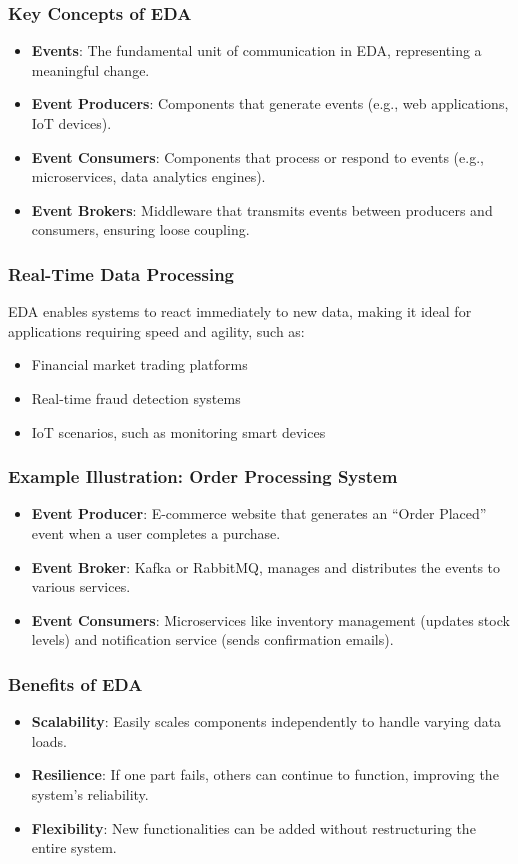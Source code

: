 \documentclass[aspectratio=169]{beamer}
\begin{document}
\begin{frame}[fragile]
    \frametitle{Key Concepts of EDA}
    \begin{itemize}
        \item \textbf{Events}: The fundamental unit of communication in EDA, representing a meaningful change.
        \item \textbf{Event Producers}: Components that generate events (e.g., web applications, IoT devices).
        \item \textbf{Event Consumers}: Components that process or respond to events (e.g., microservices, data analytics engines).
        \item \textbf{Event Brokers}: Middleware that transmits events between producers and consumers, ensuring loose coupling.
    \end{itemize}
\end{frame}

\begin{frame}[fragile]
    \frametitle{Real-Time Data Processing}
    EDA enables systems to react immediately to new data, making it ideal for applications requiring speed and agility, such as:
    \begin{itemize}
        \item Financial market trading platforms
        \item Real-time fraud detection systems
        \item IoT scenarios, such as monitoring smart devices
    \end{itemize}
\end{frame}

\begin{frame}[fragile]
    \frametitle{Example Illustration: Order Processing System}
    \begin{itemize}
        \item \textbf{Event Producer}: E-commerce website that generates an “Order Placed” event when a user completes a purchase.
        \item \textbf{Event Broker}: Kafka or RabbitMQ, manages and distributes the events to various services.
        \item \textbf{Event Consumers}: Microservices like inventory management (updates stock levels) and notification service (sends confirmation emails).
    \end{itemize}
\end{frame}

\begin{frame}[fragile]
    \frametitle{Benefits of EDA}
    \begin{itemize}
        \item \textbf{Scalability}: Easily scales components independently to handle varying data loads.
        \item \textbf{Resilience}: If one part fails, others can continue to function, improving the system's reliability.
        \item \textbf{Flexibility}: New functionalities can be added without restructuring the entire system.
    \end{itemize}
\end{frame}
\end{document}

